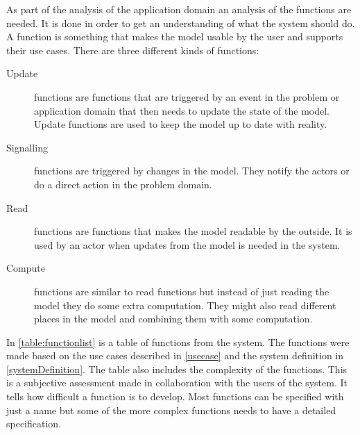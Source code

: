 As part of the analysis of the application domain an analysis of the functions are needed. It is done in order to get an understanding of what the system should do. A function is something that makes the model usable by the user and supports their use cases. There are three different kinds of functions:

\begin{description}
    \item[Update] functions are functions that are triggered by an event in the problem or application domain that then needs to update the state of the model. Update functions are used to keep the model up to date with reality.

    \item[Signalling] functions are triggered by changes in the model. They notify the actors or do a direct action in the problem domain. 

    \item[Read] functions are functions that makes the model readable by
the outside. It is used by an actor when updates from the model is needed in the system.

    \item[Compute] functions are similar to read functions but instead of just reading the model they do some extra computation. They might also read different places in the model and combining them with some computation.
\end{description}

In \cref{table:functionlist} is a table of functions from the system. The functions were made based on the use cases described in \cref{usecase} and the system definition in \cref{systemDefinition}. The table also includes the complexity of the functions. This is a subjective assessment made in collaboration with the users of the system. It tells how difficult a function is to develop. Most functions can be specified with just a name but some of the more complex functions needs to have a detailed specification.

